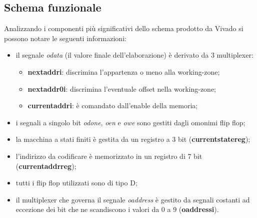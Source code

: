\documentclass{article}
\begin{document}
\subsection{Schema funzionale}
Analizzando i componenti più significativi dello schema prodotto da Vivado si possono notare le seguenti informazioni:
\begin{itemize}
	\item il segnale \textit{o\textunderscore data} (il valore finale dell'elaborazione) è derivato da 3 multiplexer:
	\begin{itemize}
		\item \textbf{next\textunderscore addr\textunderscore i}: discrimina l'appartenza o meno alla working-zone;
		\item \textbf{next\textunderscore addr0\textunderscore i}: discrimina l'eventuale offset nella working-zone;
		\item \textbf{current\textunderscore addr\textunderscore i}: è comandato dall'enable della memoria;
	\end{itemize} 
	\item i segnali a singolo bit \textit{o\textunderscore done}, \textit{o\textunderscore en} e \textit{o\textunderscore we} sono gestiti dagli omonimi flip flop;
	\item la macchina a stati finiti è gestita da un registro a 3 bit (\textbf{current\textunderscore state\textunderscore reg});
	\item l'indirizzo da codificare è memorizzato in un registro di 7 bit (\textbf{current\textunderscore addr\textunderscore reg});
	\item tutti i flip flop utilizzati sono di tipo D;
	\item il multiplexer che governa il segnale \textit{o\textunderscore address} è gestito da segnali costanti ad eccezione dei bit che ne scandiscono i valori da 0 a 9 (\textbf{o\textunderscore address\textunderscore i\textunderscore {}}).
\end{itemize}
\end{document}
